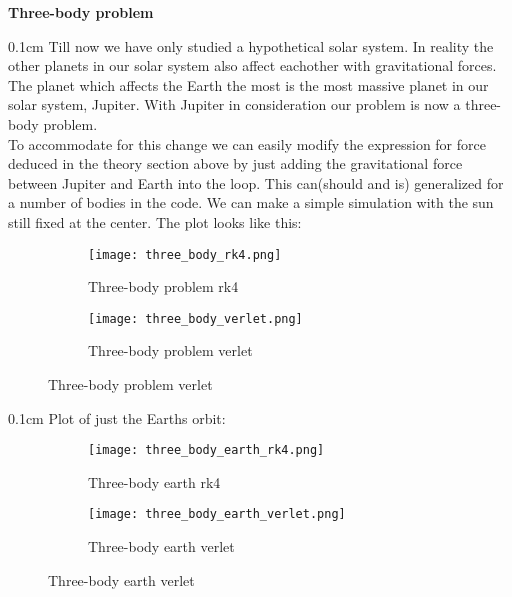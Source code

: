 \documentclass[11 pt, a4 paper]{article}
\newenvironment{tabbed}{\begin{addmargin}{0.1cm}}{\end{addmargin}}
\newcommand{\sectiontitle}[1]{\begin{center} \Large\textbf{{#1}} \end{center}}
\newcommand{\vsp}{\vspace{0.2cm}}
\begin{document}
\sectiontitle{Three-body problem}
    \begin{tabbed}
        Till now we have only studied a hypothetical solar system. In reality the other planets in our solar system also affect eachother with gravitational forces. The planet which affects the Earth the most is the most massive planet in our solar system, Jupiter. With Jupiter in consideration our problem is now a three-body problem.\vsp\\
        To accommodate for this change we can easily modify the expression for force deduced in the theory section above by just adding the gravitational force between Jupiter and Earth into the loop. This can(should and is) generalized for a number of bodies in the code. We can make a simple simulation with the sun still fixed at the center. The plot looks like this:
    \end{tabbed}
        \begin{figure}[H]
            \captionsetup[subfigure]{labelformat=empty}
            \begin{subfigure}[b!]{0.6\textwidth}
                \centering
                \texttt{[image: three\_body\_rk4.png]}
                \caption{Three-body problem rk4}
            \end{subfigure}
            \begin{subfigure}[b!]{0.6\textwidth}
                \texttt{[image: three\_body\_verlet.png]}
                \caption{Three-body problem verlet}
            \end{subfigure}
        \end{figure}
    \begin{tabbed}
        Plot of just the Earths orbit:
    \end{tabbed}
        \begin{figure}[H]
            \captionsetup[subfigure]{labelformat=empty}
            \begin{subfigure}[b!]{0.6\textwidth}
                \centering
                \texttt{[image: three\_body\_earth\_rk4.png]}
                \caption{Three-body earth rk4}
            \end{subfigure}
            \begin{subfigure}[b!]{0.6\textwidth}
                \texttt{[image: three\_body\_earth\_verlet.png]}
                \caption{Three-body earth verlet}
            \end{subfigure}
        \end{figure}
\end{document}

